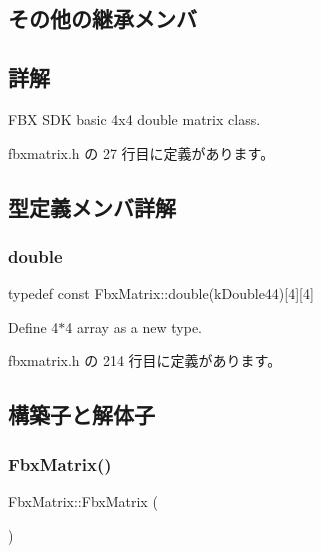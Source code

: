\subsection*{その他の継承メンバ}


\subsection{詳解}
F\+BX S\+DK basic 4x4 double matrix class. 

 fbxmatrix.\+h の 27 行目に定義があります。



\subsection{型定義メンバ詳解}
\mbox{\label{class_fbx_matrix_a01f8be57393e5d9973b23897c29d5520}} 
\subsubsection{\texorpdfstring{double}{double}}
{\footnotesize\ttfamily typedef const Fbx\+Matrix\+::double(k\+Double44)\mbox{[}4\mbox{]}\mbox{[}4\mbox{]}}



Define 4$\ast$4 array as a new type. 



 fbxmatrix.\+h の 214 行目に定義があります。



\subsection{構築子と解体子}
\mbox{\label{class_fbx_matrix_a06dc051202b75dec9827f9bddaae2007}} 
\subsubsection{\texorpdfstring{Fbx\+Matrix()}{FbxMatrix()}\hspace{0.1cm}{\footnotesize\ttfamily [1/6]}}
{\footnotesize\ttfamily Fbx\+Matrix\+::\+Fbx\+Matrix (\begin{DoxyParamCaption}{ }\end{DoxyParamCaption})}



